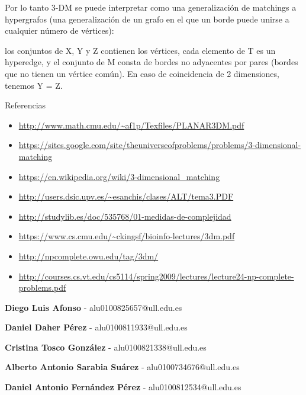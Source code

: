 \documentclass[10pt, mathserif, profesionalfont]{beamer}
\begin{document}
	\begin{frame}
		\begin{block}{}
			Por lo tanto 3-DM se puede interpretar como una generalización de matchings a hypergrafos (una generalización de un grafo en el que un borde puede unirse a cualquier número de vértices):
		\end{block}
		\begin{block}{}
			los conjuntos de X, Y y Z contienen los vértices, cada elemento de T es un hyperedge, y el conjunto de M consta de bordes no adyacentes por pares (bordes que no tienen un vértice común). En caso de coincidencia de 2 dimensiones, tenemos Y = Z.
		\end{block}
	\end{frame}
	

	\begin{frame}{Referencias}
		
		\begin{block}{}
			\begin{itemize}{}
				\item \url{http://www.math.cmu.edu/~af1p/Texfiles/PLANAR3DM.pdf}
				\item \url{https://sites.google.com/site/theuniverseofproblems/problems/3-dimensional-matching}
				\item \url{https://en.wikipedia.org/wiki/3-dimensional\_matching}
				\item \url{http://users.dsic.upv.es/~esanchis/clases/ALT/tema3.PDF}
				\item \url{http://studylib.es/doc/535768/01-medidas-de-complejidad}
				\item \url{https://www.cs.cmu.edu/~ckingsf/bioinfo-lectures/3dm.pdf}
				\item \url{http://npcomplete.owu.edu/tag/3dm/}
				\item \url{http://courses.cs.vt.edu/cs5114/spring2009/lectures/lecture24-np-complete-problems.pdf}
			\end{itemize}
		\end{block}
		
	\end{frame}


	\begin{frame}{}
	\begin{center}
			\textbf{Diego Luis Afonso} - alu0100825657@ull.edu.es 
	\end{center}
	\begin{center}
			\textbf{Daniel Daher Pérez} - alu0100811933@ull.edu.es
	\end{center}
	\begin{center}
		\textbf{Cristina Tosco González} - alu0100821338@ull.edu.es
	\end{center}
	\begin{center}
		\textbf{Alberto Antonio Sarabia Suárez} - alu0100734676@ull.edu.es
	\end{center}
	\begin{center}
		\textbf{Daniel Antonio Fernández Pérez} - alu0100812534@ull.edu.es
	\end{center}
	\end{frame}
\end{document}
